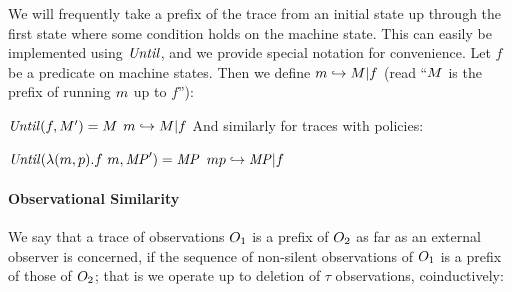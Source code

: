 \documentclass[acmsmall,review,anonymous]{acmart}\settopmatter{printfolios=true,printccs=false,printacmref=false}
\begin{document}
We will frequently take a prefix of the trace from an initial state up
through the first state where some condition holds on the machine state.
This can easily be implemented using \(\mathit{Until}\), and we provide special notation
for convenience.
%
Let \(f\) be a predicate on machine states. Then we define \(m
\hookrightarrow M | f\) (read ``\(M\) is the prefix of
running \(m\) up to \(f\)''):

            {\(\mathit{Until}(f,M')
              = M\)}
            {\(m \hookrightarrow M | f\)}
\noindent
And similarly for traces with policies:

            {\(\mathit{Until}(\lambda (m,p).f\ m,\mathit{MP}') = \mathit{MP}\)}
         {\(mp \hookrightarrow \mathit{MP} | f\)}


\paragraph*{Observational Similarity}

We say that a trace of observations $O_1$ is a prefix of $O_2$
as far as an external observer is concerned, if the sequence of
non-silent observations of $O_1$ is a prefix of those of
$O_2$; that is we operate up to deletion of \(\tau\) observations,
coinductively:

\begin{minipage}{.3\textwidth}
  \judgment{}{\(\obsT \lesssim \obsT\)}
\end{minipage}
\begin{minipage}{.3\textwidth}
\judgment{}{\(\tau \lesssim \obsT\)}
\end{minipage}
\begin{minipage}{.3\textwidth}
\end{minipage}
\end{document}
